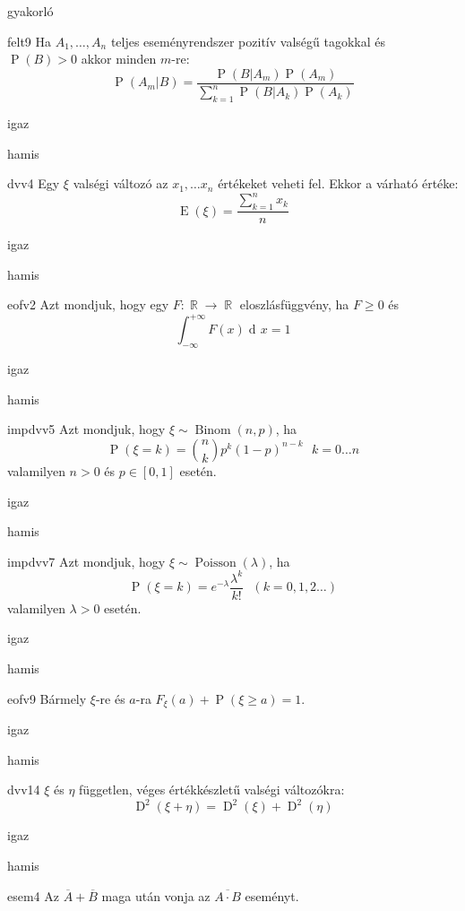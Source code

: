 \documentclass[12pt]{article}
\DeclareMathOperator{\Binom}{Binom}
\DeclareMathOperator{\E}{E}
\DeclareMathOperator{\D}{D}
\renewcommand{\P}{\operatorname{P}}
\renewcommand{\d}{\operatorname{d\! }} %
\DeclareMathOperator{\R}{\mathbb{R}}
\DeclareMathOperator{\Poi}{{Poisson}}
\begin{document}
\begin{quiz}{gyakorló}

\begin{multi}{felt9}
Ha $A_1,\ldots,A_n$ teljes eseményrendszer pozitív valségű tagokkal és $\P(B)>0$ akkor minden $m$-re:
$$
\P(A_m|B)=\frac{\P(B|A_m)\P(A_m)}{\sum_{k=1}^n \P(B|A_k)\P(A_k)}
$$
\item* igaz
\item hamis
\end{multi}
\begin{multi}{dvv4}
Egy $\xi$ valségi változó az $x_1,\ldots x_n$ értékeket veheti fel. Ekkor a várható értéke:
$$
\E(\xi)=\frac{\sum_{k=1}^n x_k}{n}
$$
\item igaz
\item* hamis
\end{multi}
\begin{multi}{eofv2}
Azt mondjuk, hogy egy $F:\R\to \R$ eloszlásfüggvény, ha $F\ge 0$ és 
$$
\int_{-\infty}^{+\infty}F(x)\d x=1
$$
\item igaz
\item* hamis
\end{multi}
\begin{multi}{impdvv5}
Azt mondjuk, hogy $\xi\sim \Binom(n,p)$, ha 
$$
\P(\xi=k)=\binom{n}{k}p^k(1-p)^{n-k}\ \ \ k=0\ldots n
$$
valamilyen $n>0$ és $p\in[0,1]$ esetén.
\item* igaz
\item hamis
\end{multi}
\begin{multi}{impdvv7}
Azt mondjuk, hogy $\xi\sim \Poi(\lambda)$, ha 
$$
\P(\xi=k)=e^{-\lambda}\frac{\lambda^k}{k!}\ \ \ (k=0,1,2\ldots )
$$ 
valamilyen $\lambda>0$ esetén.
\item* igaz
\item hamis
\end{multi}
\begin{multi}{eofv9}
Bármely $\xi$-re és $a$-ra $F_{\xi}(a)+\P(\xi\ge a)=1$.
\item* igaz
\item hamis
\end{multi}
\begin{multi}{dvv14}
$\xi$ és $\eta$ független, véges értékkészletű valségi változókra:
$$
\D^2(\xi+\eta)=\D^2(\xi)+\D^2(\eta)
$$
\item* igaz
\item hamis
\end{multi}
\begin{multi}{esem4}
Az $\overline{A} + \overline{B}$ maga után vonja az $\overline{A\cdot B}$ eseményt.

\end{multi}
\end{quiz}
\end{document}
